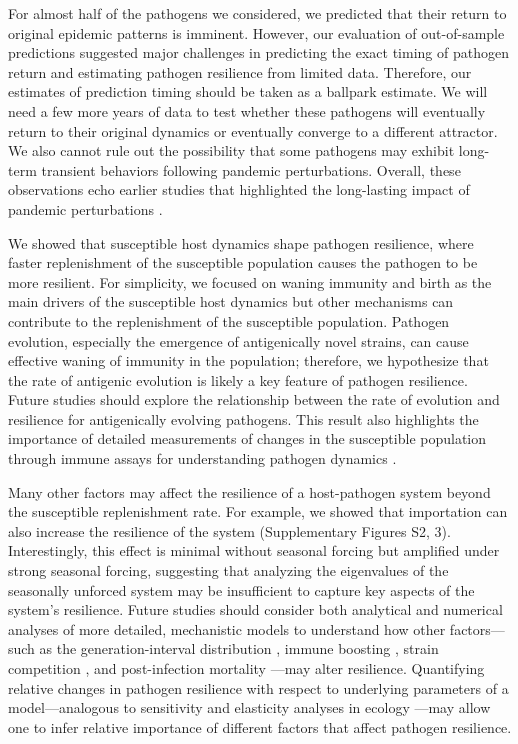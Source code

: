 \documentclass[12pt]{article}
\begin{document}
For almost half of the pathogens we considered, we predicted that their return to original epidemic patterns is imminent.
However, our evaluation of out-of-sample predictions suggested major challenges in predicting the exact timing of pathogen return and estimating pathogen resilience from limited data. 
Therefore, our estimates of prediction timing should be taken as a ballpark estimate.
We will need a few more years of data to test whether these pathogens will eventually return to their original dynamics or eventually converge to a different attractor.
We also cannot rule out the possibility that some pathogens may exhibit long-term transient behaviors following pandemic perturbations.
Overall, these observations echo earlier studies that highlighted the long-lasting impact of pandemic perturbations \citep{baker2022long,caini2024probable,chen2024covid,park2024predicting,nielsen2025complex}. 

We showed that susceptible host dynamics shape pathogen resilience, where faster replenishment of the susceptible population causes the pathogen to be more resilient.
For simplicity, we focused on waning immunity and birth as the main drivers of the susceptible host dynamics but other mechanisms can contribute to the replenishment of the susceptible population.
Pathogen evolution, especially the emergence of antigenically novel strains, can cause effective waning of immunity in the population;
therefore, we hypothesize that the rate of antigenic evolution is likely a key feature of pathogen resilience.
Future studies should explore the relationship between the rate of evolution and resilience for antigenically evolving pathogens.
This result also highlights the importance of detailed measurements of changes in the susceptible population through immune assays for understanding pathogen dynamics \citep{nguyen2022enterovirus}.

Many other factors may affect the resilience of a host-pathogen system beyond the susceptible replenishment rate.
For example, we showed that importation can also increase the resilience of the system (Supplementary Figures S2, 3).
Interestingly, this effect is minimal without seasonal forcing but amplified under strong seasonal forcing, suggesting that analyzing the eigenvalues of the seasonally unforced system may be insufficient to capture key aspects of the system’s resilience.
Future studies should consider both analytical and numerical analyses of more detailed, mechanistic models to understand how other factors---such as the generation-interval distribution \citep{lloyd2001realistic}, immune boosting \citep{lavine2011natural}, strain competition \citep{reich2013interactions}, and post-infection mortality \citep{saad2023epidemiological}---may alter resilience.
Quantifying relative changes in pathogen resilience with respect to underlying parameters of a model---analogous to sensitivity and elasticity analyses in ecology \citep{benton1999elasticity,matser2009elasticity}---may allow one to infer relative importance of different factors that affect pathogen resilience.
\end{document}
